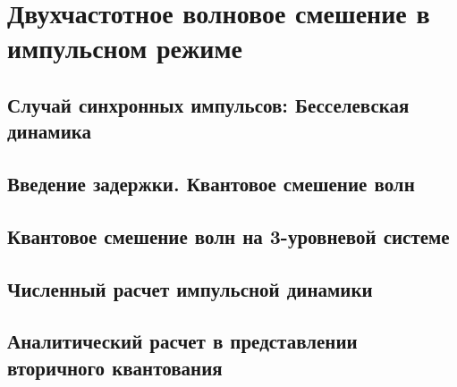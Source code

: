 \chapter{Двухчастотное волновое смешение в импульсном режиме
	}
\section{Случай синхронных импульсов: Бесселевская динамика}
\section{Введение задержки. Квантовое смешение волн}
\section{Квантовое смешение волн на 3-уровневой системе}
\section{Численный расчет импульсной динамики}
\section{Аналитический расчет в представлении вторичного квантования}

